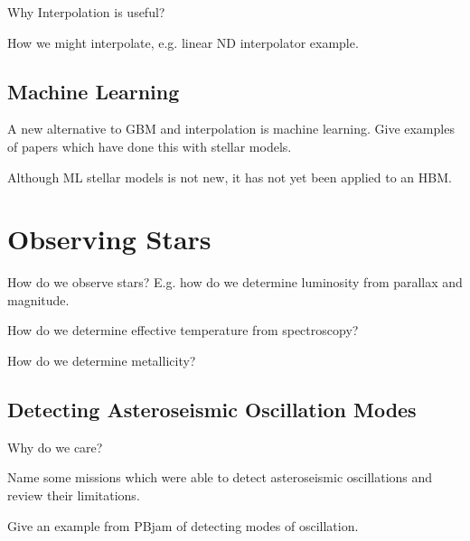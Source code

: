 Why Interpolation is useful?

How we might interpolate, e.g. linear ND interpolator example.

\subsection{Machine Learning}

A new alternative to GBM and interpolation is machine learning. Give examples of papers which have done this with stellar models.

Although ML stellar models is not new, it has not yet been applied to an HBM. 

\section{Observing Stars}

How do we observe stars? E.g. how do we determine luminosity from parallax and magnitude.

How do we determine effective temperature from spectroscopy?

How do we determine metallicity?

\subsection{Detecting Asteroseismic Oscillation Modes}

Why do we care?

Name some missions which were able to detect asteroseismic oscillations and review their limitations.

Give an example from PBjam of detecting modes of oscillation.
